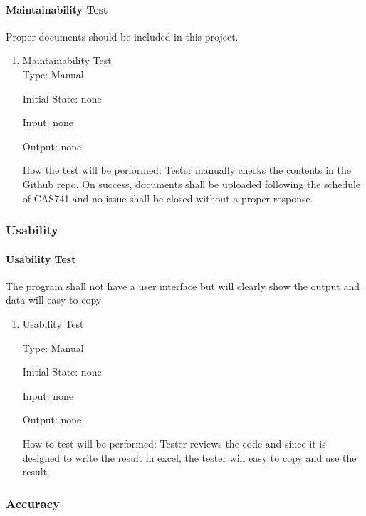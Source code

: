 \documentclass[12pt, titlepage]{article}
\begin{document}
\paragraph{Maintainability Test} Proper documents should be included in this project. 

\begin{enumerate}
\item{Maintainability Test}\\

Type: Manual
					
Initial State: none
					
Input: none
					
Output: none
					
How the test will be performed: Tester manually checks the contents in the Github repo. On success, documents shall be uploaded following the schedule of CAS741 and no issue shall be closed without a proper response.

\end{enumerate}

\subsubsection{Usability}\label{Audst}

\paragraph{Usability Test}  The program shall not have a user interface but will clearly show the output and data will easy to copy 

\begin{enumerate}
\item{Usability Test\\}

Type: Manual
					
Initial State: none
					
Input: none
					
Output: none
					
How to test will be performed: Tester reviews the code and since it is designed to write the result in excel, the tester will easy to copy and use the result.

\end{enumerate}

\subsubsection{Accuracy}\label{Audst}
\end{document}
